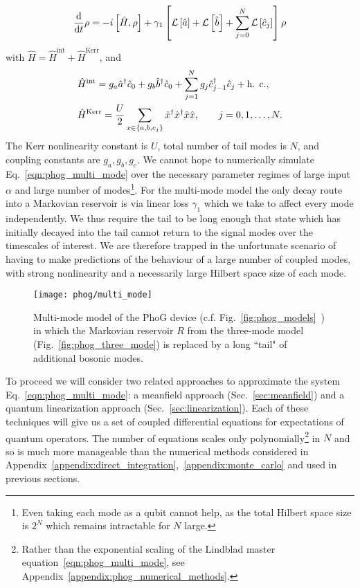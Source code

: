 \begin{equation}\label{eqn:phog_multi_mode}
\frac{\mathrm{d}}{\mathrm{d}t} \rho = - i \left[\hat{H}, \rho\right] + \gamma_1 \left[\mathcal{L}\left[\hat{a}\right] + \mathcal{L}\left[\hat{b}\right] + \sum_{j=0}^N \mathcal{L}\left[\hat{c}_j\right] \right] \rho
\end{equation}
with $\hat{H} = \hat{H}^{\text{int}} + \hat{H}^{\text{Kerr}}$, and
\begin{align}
&\hat{H}^{\text{int}} = g_a \hat{a}^\dagger \hat{c}_0 + g_b \hat{b}^\dagger \hat{c}_0 + \sum_{j=1}^N g_j \hat{c}_{j-1}^\dagger \hat{c}_j + \hc, \notag \\
%
&\hat{H}^{\text{Kerr}} = \frac{U}{2} \sum_{x \in \left\{a, b, c_j\right\}} \hat{x}^\dagger \hat{x}^\dagger \hat{x} \hat{x}, \qq{} j = 0, 1, \dots, N.
\end{align}
The Kerr nonlinearity constant is $U$, total number of tail modes is $N$, and coupling constants are $g_a, g_b, g_c$. We cannot hope to numerically simulate Eq.~\ref{eqn:phog_multi_mode} over the necessary parameter regimes of large input $\alpha$ and large number of modes\footnote{Even taking each mode as a qubit cannot help, as the total Hilbert space size is $2^{N}$ which remains intractable for $N$ large.}. For the multi-mode model the only decay route into a Markovian reservoir is via linear loss $\gamma_1$ which we take to affect every mode independently. We thus require the tail to be long enough that state which has initially decayed into the tail cannot return to the signal modes over the timescales of interest. We are therefore trapped in the unfortunate scenario of having to make predictions of the behaviour of a large number of coupled modes, with strong nonlinearity and a necessarily large Hilbert space size of each mode. 

\begin{figure}[htp]
\captionsetup{width=0.8\linewidth}
\centering
\texttt{[image: phog/multi\_mode]}
\caption{\label{fig:phog_multi_mode} Multi-mode model of the PhoG device (c.f. Fig.~\ref{fig:phog_models}~\MakeUppercase{}) in which the Markovian reservoir $R$ from the three-mode model (Fig.~\ref{fig:phog_three_mode}) is replaced by a long ``tail" of additional bosonic modes.}
\end{figure}

To proceed we will consider two related approaches to approximate the system Eq.~\ref{eqn:phog_multi_mode}: a meanfield approach (Sec.~\ref{sec:meanfield}) and a quantum linearization approach (Sec.~\ref{sec:linearization}). Each of these techniques will give us a set of coupled differential equations for expectations of quantum operators. The number of equations scales only polynomially\footnote{Rather than the exponential scaling of the Lindblad master equation~\ref{eqn:phog_multi_mode}, see Appendix~\ref{appendix:phog_numerical_methods}.} in $N$ and so is much more manageable than the numerical methods considered in Appendix~\ref{appendix:direct_integration},~\ref{appendix:monte_carlo} and used in previous sections.

